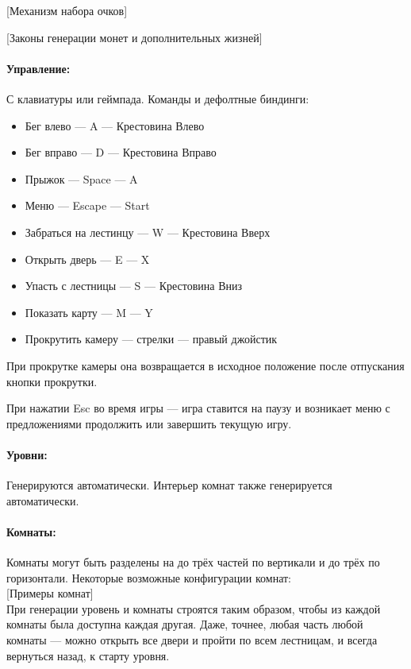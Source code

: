 \documentclass[12pt,a4paper]{article}
\begin{document}
{\color{red} [Механизм набора очков]}

{\color{red} [Законы генерации монет и дополнительных жизней]}


\paragraph{Управление:}
С клавиатуры или геймпада.
Команды и дефолтные биндинги:
\begin{itemize}
\item Бег влево --- A --- Крестовина Влево
\item Бег вправо --- D --- Крестовина Вправо
\item Прыжок --- Space --- A
\item Меню --- Escape --- Start
\item Забраться на лестинцу --- W --- Крестовина Вверх
\item Открыть дверь --- E --- X
\item Упасть с лестницы --- S --- Крестовина Вниз
\item Показать карту --- M --- Y
\item Прокрутить камеру --- стрелки --- правый джойстик
\end{itemize}
При прокрутке камеры она возвращается в исходное положение после отпускания кнопки прокрутки.

При нажатии Esc во время игры --- игра ставится на паузу и возникает меню с предложениями продолжить или завершить текущую игру.

\paragraph{Уровни:}
Генерируются автоматически. Интерьер комнат также генерируется автоматически.

\paragraph{Комнаты:}
Комнаты могут быть разделены на до трёх частей по вертикали и до трёх по горизонтали. Некоторые возможные конфигурации комнат:\\

{\color{blue}[Примеры комнат]}\\

При генерации уровень и комнаты строятся таким образом, чтобы из каждой комнаты была доступна каждая другая. Даже, точнее, любая часть любой комнаты --- можно открыть все двери и пройти по всем лестницам, и всегда вернуться назад, к старту уровня.
\end{document}
